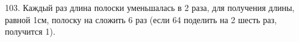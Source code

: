 103. Каждый раз длина полоски уменьшалась в 2 раза, для получения длины, равной 1см, полоску на сложить 6 раз (если 64 поделить на 2 шесть раз, получится 1).\\
